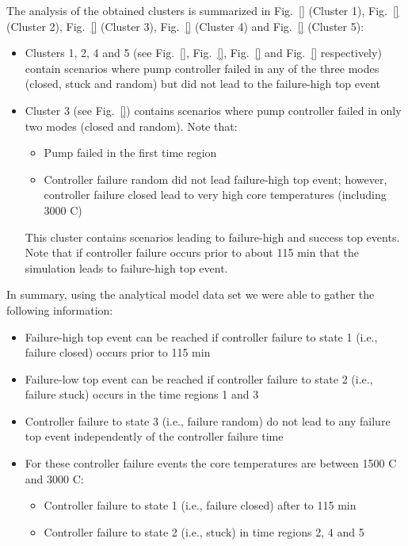 The analysis of the obtained clusters is summarized in Fig.~\ref{} (Cluster 1), Fig.~\ref{} (Cluster 2), 
Fig.~\ref{} (Cluster 3), Fig.~\ref{} (Cluster 4) and Fig.~\ref{} (Cluster 5):
\begin{itemize}
  \item Clusters 1, 2, 4 and 5 (see Fig.~\ref{}, Fig.~\ref{}, Fig.~\ref{} and Fig.~\ref{} respectively) 
        contain scenarios where pump controller failed in any of the three modes (closed, stuck and
        random) but did not lead to the failure-high top event 
  \item Cluster 3 (see Fig.~\ref{}) contains scenarios where pump controller failed in only two modes 
        (closed and random). Note that:
  \begin{itemize}
    \item Pump failed in the first time region
    \item Controller failure random did not lead failure-high top event; however, controller failure closed 
          lead to very high core temperatures (including 3000 C)
   \end{itemize}
   This cluster contains scenarios leading to failure-high and success top events. Note that if controller 
   failure occurs prior to about 115 min that the simulation leads to failure-high top event.
\end{itemize}

In summary, using the analytical model data set we were able to gather the following information:
\begin{itemize}
  \item Failure-high top event can be reached if controller failure to state 1 (i.e., failure closed) occurs 
        prior to 115 min 
  \item Failure-low top event can be reached if controller failure to state 2 (i.e., failure stuck) occurs 
        in the time regions 1 and 3
  \item Controller failure to state 3 (i.e., failure random) do not lead to any failure top event independently 
        of the controller failure time
  \item For these controller failure events the core temperatures are between 1500 C and 3000 C:
  \begin{itemize}
    \item Controller failure to state 1 (i.e., failure closed) after to 115 min
    \item Controller failure to state 2 (i.e., stuck) in time regions 2, 4 and 5
  \end{itemize}
\end{itemize}

